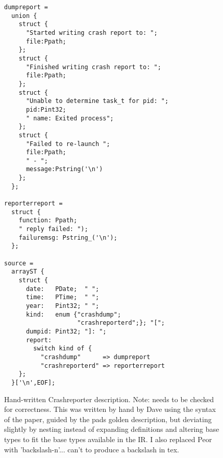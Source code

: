 \begin{figure}
\begin{verbatim}
dumpreport =
  union {
    struct {
      "Started writing crash report to: "; 
      file:Ppath;
    };
    struct {
      "Finished writing crash report to: "; 
      file:Ppath;
    };
    struct {
      "Unable to determine task_t for pid: "; 
      pid:Pint32; 
      " name: Exited process";
    };
    struct {
      "Failed to re-launch "; 
      file:Ppath; 
      " - "; 
      message:Pstring('\n')
    };
  };

reporterreport =
  struct {
    function: Ppath; 
    " reply failed: ");
    failuremsg: Pstring_('\n'); 
  };

source =
  arrayST {
    struct {
      date:   PDate;  " ";
      time:   PTime;  " ";
      year:   Pint32; " ";
      kind:   enum {"crashdump"; 
                    "crashreporterd";}; "[";
      dumpid: Pint32; "]: ";
      report: 
        switch kind of {
          "crashdump"      => dumpreport
          "crashreporterd" => reporterreport
    };
  }['\n',EOF];
\end{verbatim}

\caption{Hand-written \ir{} Crashreporter description.  
  Note: needs to be checked for correctness.  This was written by hand by Dave
  using the syntax of the paper, guided by the pads golden description, but deviating
  slightly by nesting instead of expanding definitions and altering base types to fit the
  base types available in the IR.  I also replaced Peor with 'backslash-n'...
can't to produce a backslash in tex.}
\label{fig:crashreporter:ir}
\end{figure}

